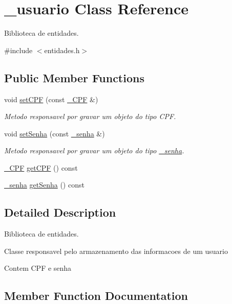 \hypertarget{class__usuario}{}\section{\+\_\+usuario Class Reference}
\label{class__usuario}


Biblioteca de entidades.  




{\ttfamily \#include $<$entidades.\+h$>$}

\subsection*{Public Member Functions}
\begin{DoxyCompactItemize}
\item 
void \mbox{\hyperlink{class__usuario_aae9711f941cbcb4e981a5ceb88d55a1c}{set\+C\+PF}} (const \mbox{\hyperlink{class___c_p_f}{\+\_\+\+C\+PF}} \&)
\begin{DoxyCompactList}\small\item\em Metodo responsavel por gravar um objeto do tipo C\+PF. \end{DoxyCompactList}\item 
void \mbox{\hyperlink{class__usuario_a9ed3a34f39c7176a58279b66dc41bce9}{set\+Senha}} (const \mbox{\hyperlink{class__senha}{\+\_\+senha}} \&)
\begin{DoxyCompactList}\small\item\em Metodo responsavel por gravar um objeto do tipo \mbox{\hyperlink{class__senha}{\+\_\+senha}}. \end{DoxyCompactList}\item 
\mbox{\hyperlink{class___c_p_f}{\+\_\+\+C\+PF}} \mbox{\hyperlink{class__usuario_a90369648983ba66dd36847a73bcf2871}{get\+C\+PF}} () const
\item 
\mbox{\hyperlink{class__senha}{\+\_\+senha}} \mbox{\hyperlink{class__usuario_aceba317161568d5598db05138720407e}{get\+Senha}} () const
\end{DoxyCompactItemize}


\subsection{Detailed Description}
Biblioteca de entidades. 

Classe responsavel pelo armazenamento das informacoes de um usuario

Contem C\+PF e senha 

\subsection{Member Function Documentation}
\mbox{\label{class__usuario_a90369648983ba66dd36847a73bcf2871}} 
